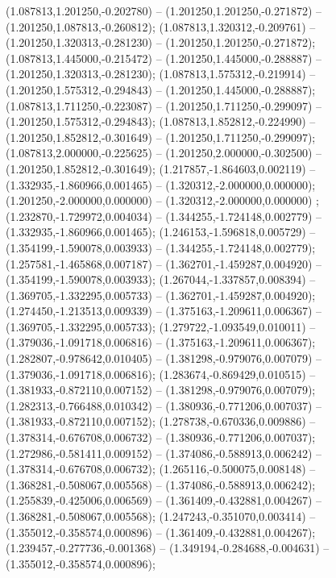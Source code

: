 (1.087813,1.201250,-0.202780) -- (1.201250,1.201250,-0.271872) -- (1.201250,1.087813,-0.260812);
 (1.087813,1.320312,-0.209761) -- (1.201250,1.320313,-0.281230) -- (1.201250,1.201250,-0.271872);
 (1.087813,1.445000,-0.215472) -- (1.201250,1.445000,-0.288887) -- (1.201250,1.320313,-0.281230);
 (1.087813,1.575312,-0.219914) -- (1.201250,1.575312,-0.294843) -- (1.201250,1.445000,-0.288887);
 (1.087813,1.711250,-0.223087) -- (1.201250,1.711250,-0.299097) -- (1.201250,1.575312,-0.294843);
 (1.087813,1.852812,-0.224990) -- (1.201250,1.852812,-0.301649) -- (1.201250,1.711250,-0.299097);
 (1.087813,2.000000,-0.225625) -- (1.201250,2.000000,-0.302500) -- (1.201250,1.852812,-0.301649);
 (1.217857,-1.864603,0.002119) -- (1.332935,-1.860966,0.001465) -- (1.320312,-2.000000,0.000000);
 (1.201250,-2.000000,0.000000) -- (1.320312,-2.000000,0.000000) ;
 (1.232870,-1.729972,0.004034) -- (1.344255,-1.724148,0.002779) -- (1.332935,-1.860966,0.001465);
 (1.246153,-1.596818,0.005729) -- (1.354199,-1.590078,0.003933) -- (1.344255,-1.724148,0.002779);
 (1.257581,-1.465868,0.007187) -- (1.362701,-1.459287,0.004920) -- (1.354199,-1.590078,0.003933);
 (1.267044,-1.337857,0.008394) -- (1.369705,-1.332295,0.005733) -- (1.362701,-1.459287,0.004920);
 (1.274450,-1.213513,0.009339) -- (1.375163,-1.209611,0.006367) -- (1.369705,-1.332295,0.005733);
 (1.279722,-1.093549,0.010011) -- (1.379036,-1.091718,0.006816) -- (1.375163,-1.209611,0.006367);
 (1.282807,-0.978642,0.010405) -- (1.381298,-0.979076,0.007079) -- (1.379036,-1.091718,0.006816);
 (1.283674,-0.869429,0.010515) -- (1.381933,-0.872110,0.007152) -- (1.381298,-0.979076,0.007079);
 (1.282313,-0.766488,0.010342) -- (1.380936,-0.771206,0.007037) -- (1.381933,-0.872110,0.007152);
 (1.278738,-0.670336,0.009886) -- (1.378314,-0.676708,0.006732) -- (1.380936,-0.771206,0.007037);
 (1.272986,-0.581411,0.009152) -- (1.374086,-0.588913,0.006242) -- (1.378314,-0.676708,0.006732);
 (1.265116,-0.500075,0.008148) -- (1.368281,-0.508067,0.005568) -- (1.374086,-0.588913,0.006242);
 (1.255839,-0.425006,0.006569) -- (1.361409,-0.432881,0.004267) -- (1.368281,-0.508067,0.005568);
 (1.247243,-0.351070,0.003414) -- (1.355012,-0.358574,0.000896) -- (1.361409,-0.432881,0.004267);
 (1.239457,-0.277736,-0.001368) -- (1.349194,-0.284688,-0.004631) -- (1.355012,-0.358574,0.000896);
